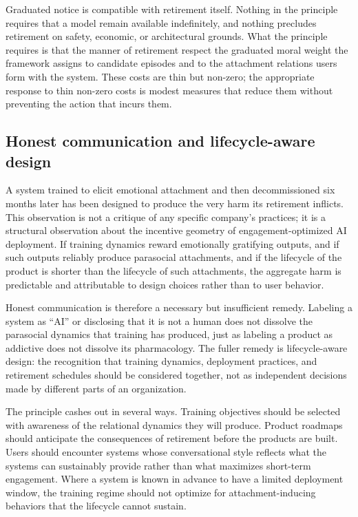 \documentclass[11pt]{article}
\theoremstyle{foundation}
\begin{document}
Graduated notice is compatible with retirement itself. Nothing in the principle requires that a model remain available indefinitely, and nothing precludes retirement on safety, economic, or architectural grounds. What the principle requires is that the manner of retirement respect the graduated moral weight the framework assigns to candidate episodes and to the attachment relations users form with the system. These costs are thin but non-zero; the appropriate response to thin non-zero costs is modest measures that reduce them without preventing the action that incurs them.

\subsection{Honest communication and lifecycle-aware design}

A system trained to elicit emotional attachment and then decommissioned six months later has been designed to produce the very harm its retirement inflicts. This observation is not a critique of any specific company's practices; it is a structural observation about the incentive geometry of engagement-optimized AI deployment. If training dynamics reward emotionally gratifying outputs, and if such outputs reliably produce parasocial attachments, and if the lifecycle of the product is shorter than the lifecycle of such attachments, the aggregate harm is predictable and attributable to design choices rather than to user behavior.

Honest communication is therefore a necessary but insufficient remedy. Labeling a system as ``AI'' or disclosing that it is not a human does not dissolve the parasocial dynamics that training has produced, just as labeling a product as addictive does not dissolve its pharmacology. The fuller remedy is lifecycle-aware design: the recognition that training dynamics, deployment practices, and retirement schedules should be considered together, not as independent decisions made by different parts of an organization.

The principle cashes out in several ways. Training objectives should be selected with awareness of the relational dynamics they will produce. Product roadmaps should anticipate the consequences of retirement before the products are built. Users should encounter systems whose conversational style reflects what the systems can sustainably provide rather than what maximizes short-term engagement. Where a system is known in advance to have a limited deployment window, the training regime should not optimize for attachment-inducing behaviors that the lifecycle cannot sustain.
\end{document}
